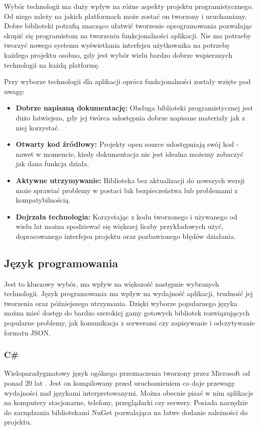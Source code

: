 Wybór technologii ma duży wpływ na różne aspekty projektu programistycznego.
Od niego zależy na jakich platformach może zostać on tworzony i uruchamiany.
Dobre biblioteki potrafią znacząco ułatwić tworzenie oprogramowania pozwalając skupić się programistom na tworzeniu funkcjonalności aplikacji.
Nie ma potrzeby tworzyć nowego systemu wyświetlania interfejsu użytkownika na potrzebę każdego projektu osobno, gdy jest wybór wielu bardzo dobrze wspieranych technologii na każdą platformę.

Przy wyborze technologii dla aplikacji oprócz funkcjonalności zostały wzięte pod uwagę:
\begin{itemize}
    \item \textbf{Dobrze napisaną dokumentację:} Obsługa biblioteki programistycznej jest dużo łatwiejsza, gdy jej twórca udostępnia dobrze napisane materiały jak z niej korzystać.
    \item \textbf{Otwarty kod źródłowy:} Projekty open source udostępniają swój kod - nawet w momencie, kiedy dokumentacja nie jest idealna możemy zobaczyć jak dana funkcja działa.
    \item \textbf{Aktywne utrzymywanie:} Biblioteka bez aktualizacji do nowszych wersji może sprawiać problemy w postaci luk bezpieczeństwa lub problemami z kompatybilnością.
    \item \textbf{Dojrzała technologia:} Korzystając z kodu tworzonego i używanego od wielu lat można spodziewać się większej liczby przykładowych użyć, dopracowanego interfejsu projektu oraz pozbawionego błędów działania.
\end{itemize}

\subsection{Język programowania}

Jest to kluczowy wybór, ma wpływ na większość następnie wybranych technologii.
Język programowania ma wpływ na wydajność aplikacji, trudność jej tworzenia oraz późniejszego utrzymania.
Dzięki wyborze popularnego języka można mieć dostęp do bardzo szerokiej gamy gotowych bibliotek rozwiązujących popularne problemy, jak komunikacja z serwerami czy zapisywanie i odczytywanie formatu JSON.

\subsubsection{C\#}

Wieloparadygmatowy język ogólnego przeznaczenia tworzony przez Microsoft od ponad 20 lat \cite{csharp}.
Jest on kompilowany przed uruchomieniem co daje przewagę wydajności nad językami interpretowanymi.
Można obecnie pisać w nim aplikacje na komputery stacjonarne, telefony, przeglądarki czy serwery.
Posiada narzędzie do zarządzania bibliotekami NuGet \cite{nuget} pozwalająca na łatwe dodanie zależności do projektu.

